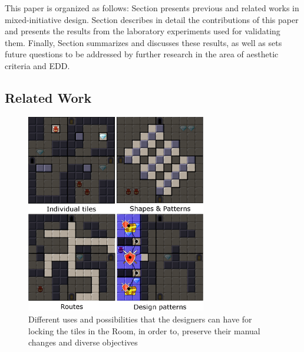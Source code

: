 
This paper is organized as follows: Section  presents previous and related works in mixed-initiative design. Section  describes in detail the contributions of this paper and presents the results from the laboratory experiments used for validating them. Finally, Section  summarizes and discusses these results, as well as sets future questions to be addressed by further research in the area of aesthetic criteria and EDD.

\subsection{Related Work} \label{p2background}

\begin{figure}
\centering
\includegraphics[width=0.7\textwidth]{included-papers-tex/paper-2/pap2-figures/figure-possible-zones.png}
\caption{Different uses and possibilities that the designers can have for locking the tiles in the Room, in order to, preserve their manual changes and diverse objectives}
\label{p2fig:possible-zones}
\end{figure}


